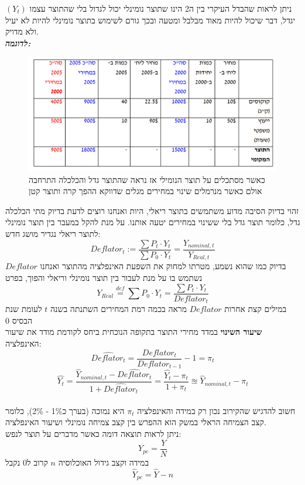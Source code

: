 \documentclass[a4paper,12pt]{article}
\begin{document}
\begin{RTL}
\begin{hebrew}
ניתן לראות שהבדל העיקרי בין ה2 הינו שתוצר נומינלי יכול לגדול בלי שהתוצר עצמו $(Y_t)$ יגדל, דבר שיכול להיות מאוד מבלבל ומטעה ובכך גורם לשימוש בתוצר נומינלי להיות לא יעיל ולא מדויק.
\\
\textbf{\textit{לדוגמה:}}
\\
\begin{figure}[H]
    \centering
    \includegraphics[width=1\linewidth]{table.png}
    \caption{כאשר מסתכלים על תוצר הנומילי אז נראה שהתוצר גדל והכלכלה התרחבה אולם כאשר מנרמלים שינוי במחירים מגלים שדווקא ההפך קרה ותוצר קטן}
\end{figure}
זהוי בדיוק הסיבה מדוע משתמשים בתוצר ריאלי, היות ואנחנו רוצים לדעת בדיוק מתי הכלכלה גדל, כלומר תוצר גדל בלי ששינוי במחירים יטעה אותנו.
על מנת להקל במעבר בין תוצר נומינלי לתוצר ריאלי נגדיר מושג חדש:
\begin{equation*}
    Deflator_t := \frac{\sum P_t \cdot Y_t}{\sum P_0 \cdot Y_t} = \frac{Y_{nominal,t}}{Y_{Real,t}}
\end{equation*}
$Deflator$ בדיוק כמו שהוא נשמע, מטרתו למחוק את השפעת האינפלציה מהתוצר ואנחנו נשתמש בו על מנת לעבור בין תוצר נומינלי וריאלי והפוך, בפרט
\begin{equation*}
    Y_{Real} \stackrel{{\textit{def}}}{=}  \sum P_0 \cdot Y_t = \frac{\sum P_t \cdot Y_t}{Deflator_t}
\end{equation*}
במילים קצת אחרות $Deflator$ מראה בכמה רמת המחירים השתנתה בשנה $t$ לעומת שנת הבסיס 0\\
\textbf{שיעור השינוי} במדד מחירי התוצר בתקופה הנוכחית ביחס לקודמת מודד את שיעור האינפלציה:
\begin{equation*}
    \widehat{Deflator_t} = \frac{Deflator_t}{Deflator_{t-1}} - 1 = \pi_t
\end{equation*}
\begin{equation*}
    \widehat{Y_t} = 
    \frac{\widehat{Y}_{nominal,t}-\widehat{Deflator_t}}{1 + \widehat{Deflator_t}} = 
    \frac{\widehat{Y_t} - \pi_t}{1+\pi_t} \approxeq 
    \widehat{Y}_{nominal,t} - \pi_t
\end{equation*}
\\
חשוב להדגיש שהקירוב נכון רק במידה והאינפלציה $\pi_t$ היא נמוכה (בערך כ1\% - 2\%), כלומר קצב הצמיחה הראלי במשק הוא ההפרש בין קצב צמיחה נומינלי ושיעור האינפלציה. \\
ניתן לראות תוצאה דומה כאשר מדברים על תוצר לנפש:
\begin{equation*}
    Y_{pc} = \frac{Y}{N} 
\end{equation*}
במידה וקצב גידול האוכלוסיה $n$ קרוב ל0 נקבל
\begin{equation*}
    \widehat{Y}_{pc} = \widehat{Y} - n 
\end{equation*}
\newpage

\end{hebrew}
\end{RTL}
\end{document}
